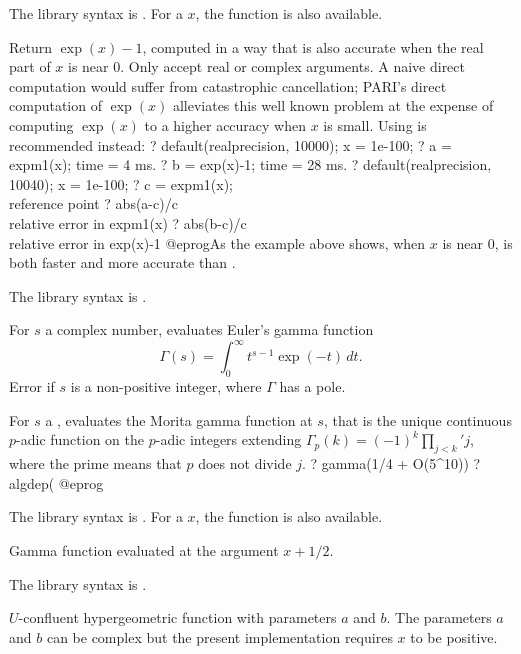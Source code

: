 The library syntax is .
For a  $x$, the function
 is also available.

\label{se:expm1}
Return $\exp(x)-1$, computed in a way that is also accurate
when the real part of $x$ is near $0$. Only accept real or complex arguments.
A naive direct computation would suffer from catastrophic cancellation;
PARI's direct computation of $\exp(x)$ alleviates this well known problem at
the expense of computing $\exp(x)$ to a higher accuracy when $x$ is small.
Using  is recommended instead:
\bprog
? default(realprecision, 10000); x = 1e-100;
? a = expm1(x);
time = 4 ms.
? b = exp(x)-1;
time = 28 ms.
? default(realprecision, 10040); x = 1e-100;
? c = expm1(x);  \\ reference point
? abs(a-c)/c  \\ relative error in expm1(x)
? abs(b-c)/c  \\ relative error in exp(x)-1
@eprog\noindent As the example above shows, when $x$ is near $0$,
 is both faster and more accurate than .

The library syntax is .

\label{se:gamma}
For $s$ a complex number, evaluates Euler's gamma
function 
$$\Gamma(s)=\int_0^\infty t^{s-1}\exp(-t)\,dt.$$
Error if $s$ is a non-positive integer, where $\Gamma$ has a pole.

For $s$ a , evaluates the Morita gamma function at $s$, that
is the unique continuous $p$-adic function on the $p$-adic integers
extending $\Gamma_p(k)=(-1)^k \prod_{j<k}'j$, where the prime means that $p$
does not divide $j$.
\bprog
? gamma(1/4 + O(5^10))
? algdep(%
@eprog

The library syntax is .
For a  $x$, the function  is
also available.

\label{se:gammah}
Gamma function evaluated at the argument $x+1/2$.

The library syntax is .

\label{se:hyperu}
$U$-confluent hypergeometric function with
parameters $a$ and $b$. The parameters $a$ and $b$ can be complex but
the present implementation requires $x$ to be positive.

